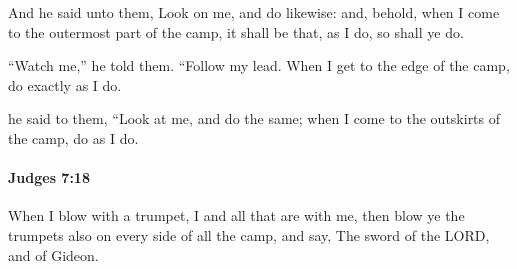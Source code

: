 			\begin{versebox}
					\item[BHS] 
					\item[ASV] And he said unto them, Look on me, and do likewise: and, behold, when I come to the outermost part of the camp, it shall be that, as I do, so shall ye do.
					\item[NIV] “Watch me,” he told them. “Follow my lead. When I get to the edge of the camp, do exactly as I do.
					\item[NRSV] he said to them, “Look at me, and do the same; when I come to the outskirts of the camp, do as I do.
			\end{versebox}

		\paragraph{Judges 7:18} %
			\label{JUDGES-7-18}

			When I blow with a trumpet, I and all that are with me, then blow ye the trumpets also on every side of all the camp, and say, The sword of the LORD, and of Gideon.

